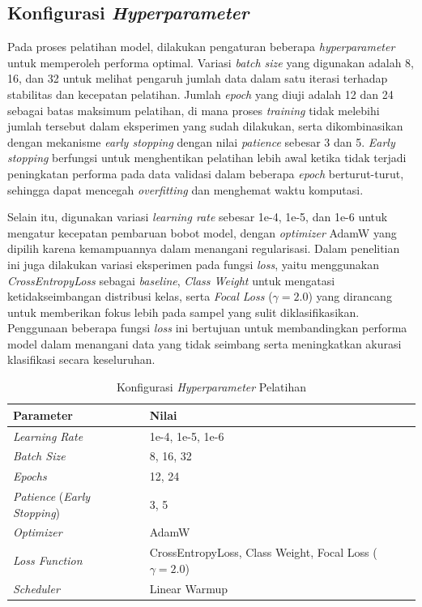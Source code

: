 \subsection{Konfigurasi \textit{Hyperparameter}} \label{IV.Model.Hyperparameter}

Pada proses pelatihan model, dilakukan pengaturan beberapa \textit{hyperparameter} untuk memperoleh performa optimal. Variasi \textit{batch size} yang digunakan adalah 8, 16, dan 32 untuk melihat pengaruh jumlah data dalam satu iterasi terhadap stabilitas dan kecepatan pelatihan. Jumlah \textit{epoch} yang diuji adalah 12 dan 24 sebagai batas maksimum pelatihan, di mana proses \textit{training} tidak melebihi jumlah tersebut dalam eksperimen yang sudah dilakukan, serta dikombinasikan dengan mekanisme \textit{early stopping} dengan nilai \textit{patience} sebesar 3 dan 5. \textit{Early stopping} berfungsi untuk menghentikan pelatihan lebih awal ketika tidak terjadi peningkatan performa pada data validasi dalam beberapa \textit{epoch} berturut-turut, sehingga dapat mencegah \textit{overfitting} dan menghemat waktu komputasi.

Selain itu, digunakan variasi \textit{learning rate} sebesar 1e-4, 1e-5, dan 1e-6 untuk mengatur kecepatan pembaruan bobot model, dengan \textit{optimizer} AdamW yang dipilih karena kemampuannya dalam menangani regularisasi. Dalam penelitian ini juga dilakukan variasi eksperimen pada fungsi \textit{loss}, yaitu menggunakan \textit{CrossEntropyLoss} sebagai \textit{baseline}, \textit{Class Weight} untuk mengatasi ketidakseimbangan distribusi kelas, serta \textit{Focal Loss} ($\gamma = 2.0$) yang dirancang untuk memberikan fokus lebih pada sampel yang sulit diklasifikasikan. Penggunaan beberapa fungsi \textit{loss} ini bertujuan untuk membandingkan performa model dalam menangani data yang tidak seimbang serta meningkatkan akurasi klasifikasi secara keseluruhan.

\begin{table}[H]
    \centering
    \caption{Konfigurasi \textit{Hyperparameter} Pelatihan}
    \label{table:4.hyperparams}
    \small
    \setlength{\tabcolsep}{3pt}
    \renewcommand{\arraystretch}{1.1}
    \begin{tabular}{p{5.0cm} p{5.0cm}}
        \hline
        \textbf{Parameter} & \textbf{Nilai} \\
        \hline
        \textit{Learning Rate} & 1e-4, 1e-5, 1e-6 \\
        \textit{Batch Size} & 8, 16, 32 \\
        \textit{Epochs} & 12, 24 \\
        \textit{Patience} (\textit{Early Stopping}) & 3, 5 \\
        \textit{Optimizer} & AdamW \\
        \textit{Loss Function} & CrossEntropyLoss, Class Weight, Focal Loss ($\gamma = 2.0$) \\
        \textit{Scheduler} & Linear Warmup \\
        \hline
    \end{tabular}
\end{table}


